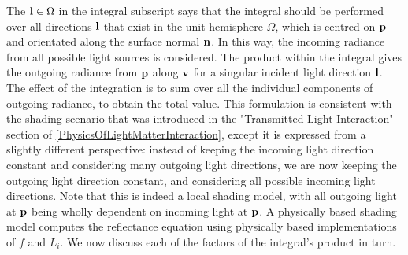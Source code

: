 The \begin{math}\mathbf{l}\in\Omega\end{math} in the integral subscript says that the integral should be performed over all directions \begin{math}\mathbf{l}\end{math} that exist in the unit hemisphere \begin{math}\Omega\end{math}, which is centred on \begin{math}\mathbf{p}\end{math} and orientated along the surface normal \begin{math}\mathbf{n}\end{math}. In this way, the incoming radiance from all possible light sources is considered. The product within the integral gives the outgoing radiance from \begin{math}\mathbf{p}\end{math} along \begin{math}\mathbf{v}\end{math} for a singular incident light direction \begin{math}\mathbf{l}\end{math}. The effect of the integration is to sum over all the individual components of outgoing radiance, to obtain the total value. This formulation is consistent with the shading scenario that was introduced in the "Transmitted Light Interaction" section of \ref{PhysicsOfLightMatterInteraction}, except it is expressed from a slightly different perspective: instead of keeping the incoming light direction constant and considering many outgoing light directions, we are now keeping the outgoing light direction constant, and considering all possible incoming light directions. Note that this is indeed a local shading model, with all outgoing light at \begin{math}\mathbf{p}\end{math} being wholly dependent on incoming light at \begin{math}\mathbf{p}\end{math}. A physically based shading model computes the reflectance equation using physically based implementations of \begin{math}f\end{math} and \begin{math}L_i\end{math}. We now discuss each of the factors of the integral's product in turn.

